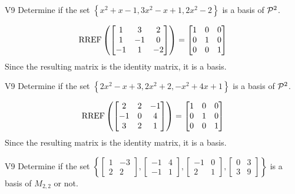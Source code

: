 \begin{problem}{V9}
Determine if the set \(\left\{ x^2+x-1, 3x^2-x+1, 2x^2-2 \right\}\) is a basis of \(\P^2\).
\end{problem}
\begin{solution}
\[\RREF\left(\begin{bmatrix} 1 & 3 & 2 \\ 1 & -1 & 0 \\ -1 & 1 & -2 \end{bmatrix} \right)= \begin{bmatrix} 1 & 0 &0 \\ 0 & 1 & 0 \\ 0 & 0 & 1\end{bmatrix}\]
Since the resulting matrix is the identity matrix, it is a basis.
\end{solution}

\begin{problem}{V9}
  Determine if the set \(\left\{ 2x^2-x+3, 2x^2+2, -x^2+4x+1 \right\}\)
  is a basis of \(\P^2\).
\end{problem}
\begin{solution}
  \[\RREF\left(
    \begin{bmatrix}
      2 & 2 & -1 \\
      -1 & 0 & 4 \\
      3 & 2 & 1
    \end{bmatrix} \right)= \begin{bmatrix}
      1 & 0 &0 \\
      0 & 1 & 0 \\
      0 & 0 & 1
    \end{bmatrix}
  \]
Since the resulting matrix is the identity matrix, it is a basis.
\end{solution}
\begin{problem}{V9}
Determine if the set \(\left\{
\begin{bmatrix} 1 & -3 \\ 2 & 2 \end{bmatrix},
\begin{bmatrix} -1 & 4 \\ -1 & 1 \end{bmatrix},
\begin{bmatrix} -1 & 0 \\ 2 & 1 \end{bmatrix},
\begin{bmatrix} 0 & 3 \\ 3 & 9 \end{bmatrix}
\right\}\) is a basis of \(M_{2,2}\) or not.
\end{problem}

